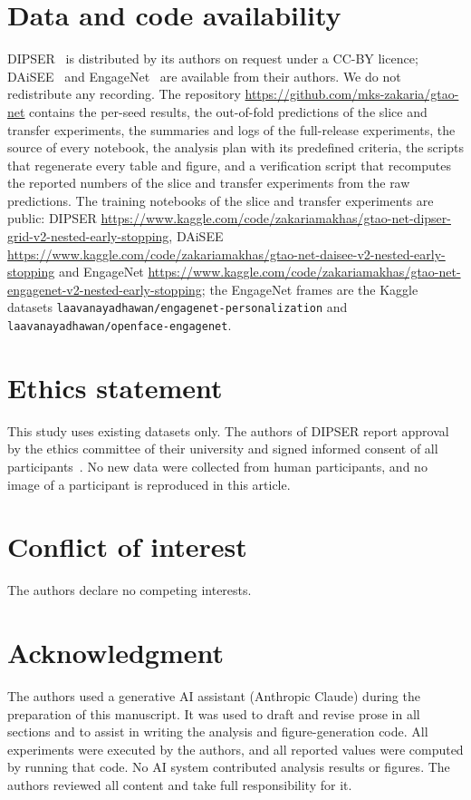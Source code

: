 \section*{Data and code availability}
DIPSER~\cite{marquezcarpintero2025dipser} is distributed by its authors on request under a CC-BY licence; DAiSEE~\cite{gupta2016daisee} and EngageNet~\cite{singh2023engagenet} are available from their authors. We do not redistribute any recording. The repository \url{https://github.com/mks-zakaria/gtao-net} contains the per-seed results, the out-of-fold predictions of the slice and transfer experiments, the summaries and logs of the full-release experiments, the source of every notebook, the analysis plan with its predefined criteria, the scripts that regenerate every table and figure, and a verification script that recomputes the reported numbers of the slice and transfer experiments from the raw predictions. The training notebooks of the slice and transfer experiments are public: DIPSER \url{https://www.kaggle.com/code/zakariamakhas/gtao-net-dipser-grid-v2-nested-early-stopping}, DAiSEE \url{https://www.kaggle.com/code/zakariamakhas/gtao-net-daisee-v2-nested-early-stopping} and EngageNet \url{https://www.kaggle.com/code/zakariamakhas/gtao-net-engagenet-v2-nested-early-stopping}; the EngageNet frames are the Kaggle datasets \texttt{laavanayadhawan/engagenet-personalization} and \texttt{laavanayadhawan/openface-engagenet}. 

\section*{Ethics statement}
This study uses existing datasets only. The authors of DIPSER report approval by the ethics committee of their university and signed informed consent of all participants~\cite{marquezcarpintero2025dipser}. No new data were collected from human participants, and no image of a participant is reproduced in this article.

\section*{Conflict of interest}
The authors declare no competing interests.

\section*{Acknowledgment}
The authors used a generative AI assistant (Anthropic Claude) during the preparation of this manuscript. It was used to draft and revise prose in all sections and to assist in writing the analysis and figure-generation code. All experiments were executed by the authors, and all reported values were computed by running that code. No AI system contributed analysis results or figures. The authors reviewed all content and take full responsibility for it.
